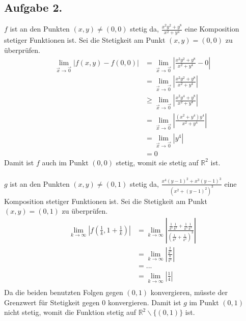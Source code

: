 \documentclass[10pt,a4paper]{scrartcl}
\newcommand{\R}{\mathbb{R}}
\begin{document}
\subsection*{Aufgabe 2.}
$f$ ist an den Punkten $(x,y) \neq (0,0)$ stetig da, $\frac{x^2y^2+y^8}{x^2+y^4}$ eine Komposition stetiger Funktionen ist. Sei die Stetigkeit am Punkt $(x,y) = (0,0)$ zu überprüfen.
\begin{align*}
\lim_{\vec{x} \to \vec{0}} \left| f(x,y) - f(0,0) \right| &= \lim_{\vec{x} \to \vec{0}} \left| \frac{x^2y^2+y^8}{x^2+y^4} - 0 \right| \\
 &= \lim_{\vec{x} \to \vec{0}} \left| \frac{x^2y^2+y^8}{x^2+y^4}\right| \\
 &\geq \lim_{\vec{x} \to \vec{0}} \left| \frac{x^2y^4+y^8}{x^2+y^4}\right| \\
 &= \lim_{\vec{x} \to \vec{0}} \left| \frac{(x^2+y^4)y^4}{x^2+y^4}\right| \\
 &=  \lim_{\vec{x} \to \vec{0}} \left| y^4 \right| \\
 &= 0
\end{align*}
Damit ist $f$ auch im Punkt $(0,0)$ stetig, womit sie stetig auf $\R^2$ ist. \\ \\
$g$ ist an den Punkten $(x,y) \neq (0,1)$ stetig da, $\frac{x^4(y-1)^2+x^3(y-1)^3}{(x^2+(y-1)^2)^3}$ eine Komposition stetiger Funktionen ist. Sei die Stetigkeit am Punkt $(x,y) = (0,1)$ zu überprüfen.
\begin{align*}
\lim_{k \to \infty} \left| f(\frac{1}{k},1+\frac{1}{k}) \right|
 &= \lim_{k \to \infty} \left| \frac{\frac{1}{k^4}\frac{1}{k^2}+\frac{1}{k^3}\frac{1}{k^3}}{(\frac{1}{k^2}+\frac{1}{k^2})^3} \right| \\
 &= \lim_{k \to \infty} \left| \frac{\frac{2}{k^6}}{\frac{8}{k^6}} \right| \\
 &= ...\\
 &= \lim_{k \to \infty} \left| \frac{1}{4} \right| \\
\end{align*}
Da die beiden benutzten Folgen gegen $(0,1)$ konvergieren, müsste der Grenzwert für Stetigkeit gegen $0$ konvergieren.
Damit ist $g$ im Punkt $(0,1)$ nicht stetig, womit die Funktion stetig auf $\R^2 \backslash \{ (0,1)\}$ ist. \\
\end{document}
